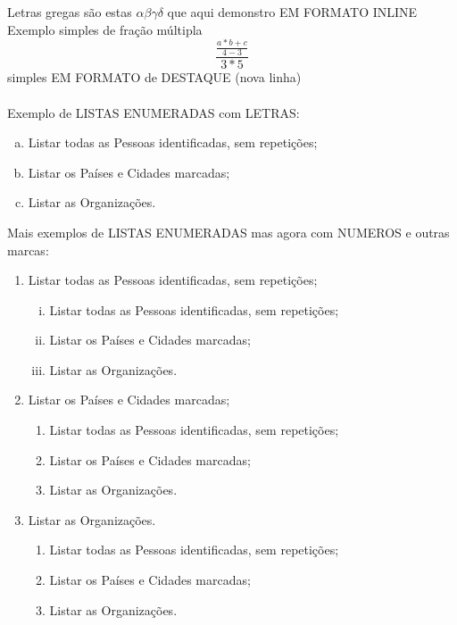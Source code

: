 \documentclass[11pt,a4paper]{report}%
\begin{document}
Letras gregas são estas $ \alpha \beta \gamma \delta $ que aqui demonstro EM FORMATO INLINE\\

Exemplo simples de fração múltipla \[ \frac{\frac{a * b + c}{4-3}}{3*5} \] simples  EM FORMATO
de DESTAQUE (nova linha)\\\\

Exemplo de LISTAS ENUMERADAS com LETRAS:
\begin{enumerate}[a)]
\item Listar todas as Pessoas identificadas, sem repetições;
\item Listar os Países e Cidades marcadas;
\item Listar as Organizações.\\ %
\end{enumerate}

Mais exemplos de LISTAS ENUMERADAS mas agora com NUMEROS e outras marcas:
\begin{enumerate}
\item Listar todas as Pessoas identificadas, sem repetições;
  \begin{enumerate}[i)]
     \item Listar todas as Pessoas identificadas, sem repetições;
     \item Listar os Países e Cidades marcadas;
     \item Listar as Organizações.\\ %
  \end{enumerate}
\item Listar os Países e Cidades marcadas;
  \begin{enumerate}[2.1)]
     \item Listar todas as Pessoas identificadas, sem repetições;
     \item Listar os Países e Cidades marcadas;
     \item Listar as Organizações.\\ %
  \end{enumerate}
\item Listar as Organizações.
    \begin{enumerate}[1)]
     \item Listar todas as Pessoas identificadas, sem repetições;
     \item Listar os Países e Cidades marcadas;
     \item Listar as Organizações.\\ %
  \end{enumerate}
\end{enumerate}
\end{document}
